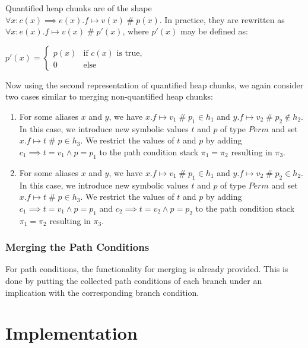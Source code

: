\documentclass[11pt]{article}
\DeclareMathOperator{\perm}{\mathbin{\#}}
\begin{document}
    Quantified heap chunks are of the shape $\forall x: c(x) \implies e(x).f \mapsto v(x) \perm p(x)$.
    In practice, they are rewritten as $\forall x: e(x).f \mapsto v(x) \perm p'(x)$, where $p'(x)$ may be defined as:

    \begin{math}
        p'(x) = \begin{cases}
            p(x) & \text{if } c(x) \text{ is true,} \\
            0 & \text{else}
        \end{cases}
    \end{math}

    Now using the second representation of quantified heap chunks, we again consider two cases similar to merging non-quantified
    heap chunks:

    \begin{enumerate}
        \item For some aliases $x$ and $y$, we have $x.f \mapsto v_1 \perm p_1 \in h_1$ and $y.f \mapsto v_2 \perm p_2 \notin h_2$.
            In this case, we introduce new symbolic values $t$ and $p$ of type $Perm$ and set $x.f \mapsto t \perm p \in h_3$.
            We restrict the values of $t$ and $p$ by adding $c_1 \implies t = v_1 \land p = p_1$
            to the path condition stack $\pi_1 = \pi_2$ resulting in $\pi_3$.
        \item For some aliases $x$ and $y$, we have $x.f \mapsto v_1 \perm p_1 \in h_1$ and $y.f \mapsto v_2 \perm p_2 \in h_2$.
            In this case, we introduce new symbolic values $t$ and $p$ of type $Perm$ and set $x.f \mapsto t \perm p \in h_3$.
            We restrict the values of $t$ and $p$ by adding $c_1 \implies t = v_1 \land p = p_1$ and $c_2 \implies t = v_2 \land p = p_2$
            to the path condition stack $\pi_1 = \pi_2$ resulting in $\pi_3$.
    \end{enumerate}

    \subsubsection{Merging the Path Conditions}

    For path conditions, the functionality for merging is already provided.
    This is done by putting the collected path conditions of each branch
    under an implication with the corresponding branch condition.

    \section{Implementation}
\end{document}
